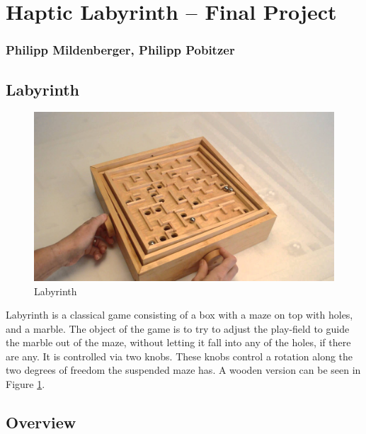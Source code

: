\documentclass[]{article}
\date{}
\begin{document}
\hypertarget{haptic-labyrinth-final-project}{%
\section{Haptic Labyrinth -- Final
Project}\label{haptic-labyrinth-final-project}}

\hypertarget{philipp-mildenberger-philipp-pobitzer}{%
\subsubsection{Philipp Mildenberger, Philipp
Pobitzer}\label{philipp-mildenberger-philipp-pobitzer}}

\hypertarget{labyrinth}{%
\subsection{Labyrinth}\label{labyrinth}}

\begin{figure}
\hypertarget{fig:lab}{%
\centering
\includegraphics[width=1\textwidth,height=\textheight]{./woodenLabyrinthHands.jpg}
\caption{Labyrinth}\label{fig:lab}
}
\end{figure}

Labyrinth is a classical game consisting of a box with a maze on top
with holes, and a marble. The object of the game is to try to adjust the
play-field to guide the marble out of the maze, without letting it fall
into any of the holes, if there are any. It is controlled via two knobs.
These knobs control a rotation along the two degrees of freedom the
suspended maze has. A wooden version can be seen in Figure
\ref{fig:lab}.

\hypertarget{overview}{%
\subsection{Overview}\label{overview}}
\end{document}
